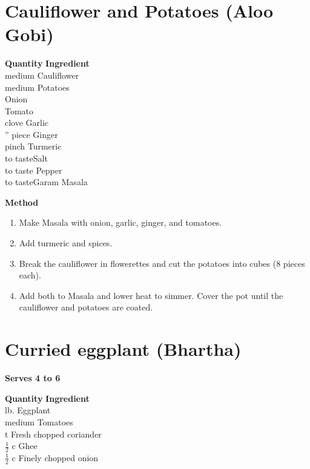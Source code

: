 
\section{Cauliflower and Potatoes (Aloo Gobi)}

\begin{tabbing}
\hspace{1.0cm}  \={\bf Quantity}   \hspace{3.0cm} \={\bf Ingredient}\\

 medium \>Cauliflower        \\
 medium \>Potatoes\\
 \>Onion   \\
 \>Tomato\\
 clove\>  Garlic\\
'' piece \>Ginger\\
\>pinch\>  Turmeric\\ 
\>to taste\>Salt\\
\>to taste\> Pepper\\
\>to taste\>Garam Masala\\
\end{tabbing}

{\bf Method}
\begin{enumerate}
\item Make Masala with onion, garlic, ginger, and tomatoes.
\item Add turmeric and spices.
\item Break the cauliflower in flowerettes and cut the potatoes
into cubes (8 pieces each).
\item Add both to Masala and lower heat to simmer. Cover the pot until the
cauliflower and potatoes are coated.
\end{enumerate}

\section{Curried eggplant (Bhartha)}
{\bf Serves 4 to 6}

\begin{tabbing}
\hspace{1.0cm}  \={\bf Quantity}   \hspace{3.0cm} \={\bf Ingredient}\\
 lb. \>Eggplant      \\
 medium \>Tomatoes\\
 t \>Fresh chopped coriander\\
\>$\frac{1}{2}$ c \>Ghee\\
\> $\frac{1}{2}$ c \>Finely chopped onion\\
\end{tabbing}

